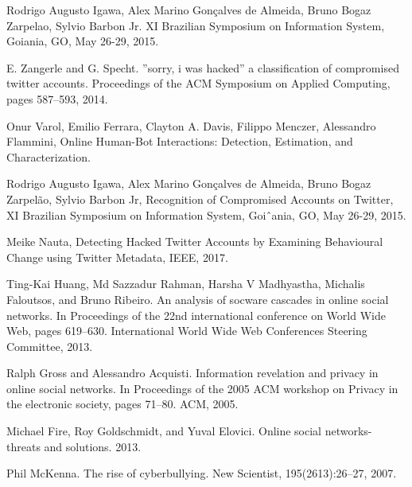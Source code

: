 \documentclass[conference]{IEEEtran}
\begin{document}
\begin{enumerate}[label={[\arabic*]}]
\item Rodrigo Augusto Igawa, Alex Marino Gonçalves de Almeida, Bruno Bogaz Zarpelao, Sylvio Barbon Jr.
XI Brazilian Symposium on Information System, Goiania, GO, May 26-29, 2015.

\item E. Zangerle and G. Specht. ”sorry, i was hacked” a
classification of compromised twitter accounts.
Proceedings of the ACM Symposium on Applied
Computing, pages 587–593, 2014.
\item Onur Varol, Emilio Ferrara, Clayton A. Davis, Filippo Menczer, Alessandro Flammini, Online Human-Bot Interactions: Detection, Estimation, and Characterization.
\item Rodrigo Augusto Igawa, Alex Marino Gonçalves de Almeida, Bruno Bogaz Zarpelão, Sylvio Barbon Jr,
Recognition of Compromised Accounts on Twitter, XI Brazilian Symposium on Information System, Goiˆania, GO, May 26-29, 2015.
\item Meike Nauta, Detecting Hacked Twitter Accounts by Examining
Behavioural Change using Twitter Metadata, IEEE, 2017.
\item Ting-Kai Huang, Md Sazzadur Rahman, Harsha V
Madhyastha, Michalis Faloutsos, and Bruno Ribeiro. An
analysis of socware cascades in online social networks.
In Proceedings of the 22nd international conference on
World Wide Web, pages 619–630. International World
Wide Web Conferences Steering Committee, 2013.
\item Ralph Gross and Alessandro Acquisti. Information
revelation and privacy in online social networks. In
Proceedings of the 2005 ACM workshop on Privacy in
the electronic society, pages 71–80. ACM, 2005.
\item Michael Fire, Roy Goldschmidt, and Yuval Elovici.
Online social networks- threats and solutions. 2013.
\item Phil McKenna. The rise of cyberbullying. New
Scientist, 195(2613):26–27, 2007.


\end{enumerate}
\end{document}
